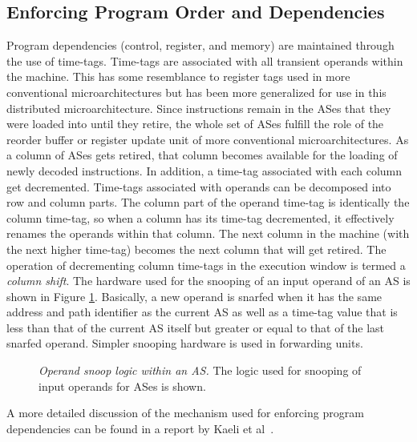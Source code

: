 \documentclass[10pt,dvips]{article}
\begin{document}
\subsection{Enforcing Program Order and Dependencies}
%
Program dependencies (control, register, and memory) are 
maintained through the use of time-tags.
Time-tags are associated with all transient operands within the machine.
This has some resemblance to register tags used in more conventional 
microarchitectures but has been more generalized for use in this
distributed microarchitecture.  
Since instructions remain in the ASes that they were loaded into until
they retire, the whole set of ASes
fulfill the role of the reorder buffer or register update unit of more
conventional microarchitectures.
As a column of ASes gets retired, that column becomes available
for the loading of newly decoded instructions.
In addition, a time-tag associated with each column get decremented.
Time-tags associated with operands can be decomposed into row and 
column parts.  The column part of the operand time-tag is
identically the column time-tag, so when a column has its time-tag
decremented, it effectively renames the operands within that column.
The next column in the machine (with the next higher time-tag)
becomes the next column that will get retired.
The operation of decrementing column time-tags 
in the execution window is termed a \textit{column shift}.
The hardware used for the snooping of an input operand of an AS
is shown in Figure \ref{fig:source}.
Basically, a new operand is snarfed when it has the same address and
path identifier as the current AS as well as
a time-tag value that is less than that of the current AS itself
but greater or equal to that of the last snarfed operand.
Simpler snooping hardware is used in forwarding units.
%
\begin{figure}
\centering
{}
\caption{{\em Operand snoop logic within an AS.}
The logic used for snooping of input operands for ASes is shown.}
\label{fig:source}
\end{figure}
%
A more detailed discussion of the mechanism used for
enforcing program dependencies
can be found in a report by Kaeli et al~\cite{Kaeli01}.
%
%
\end{document}
